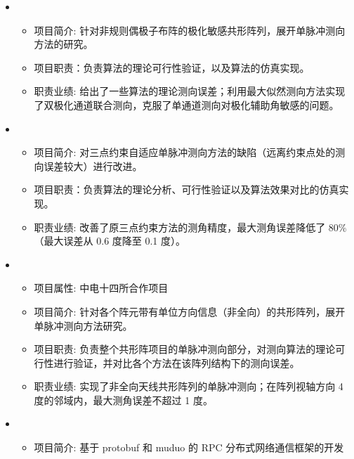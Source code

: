   \begin{itemize}[leftmargin=*]
    \item
      {\small
      \begin{itemize}
        \item 项目简介: 针对非规则偶极子布阵的极化敏感共形阵列，展开单脉冲测向方法的研究。
        \item 项目职责：负责算法的理论可行性验证，以及算法的仿真实现。
        \item 职责业绩: 给出了一些算法的理论测向误差；利用最大似然测向方法实现了双极化通道联合测向，克服了单通道测向对极化辅助角敏感的问题。
      \end{itemize}
        }
    \item
      {\small
      \begin{itemize}
        \item 项目简介: 对三点约束自适应单脉冲测向方法的缺陷（远离约束点处的测向误差较大）进行改进。
        \item 项目职责：负责算法的理论分析、可行性验证以及算法效果对比的仿真实现。
        \item 职责业绩: 改善了原三点约束方法的测角精度，最大测角误差降低了 80\%（最大误差从 0.6 度降至 0.1 度）。
      \end{itemize}
      }
    \item
    {\small
    \begin{itemize}
      \item 项目属性: 中电十四所合作项目
      \item 项目简介: 针对各个阵元带有单位方向信息（非全向）的共形阵列，展开单脉冲测向方法研究。
      \item 项目职责: 负责整个共形阵项目的单脉冲测向部分，对测向算法的理论可行性进行验证，并对比各个方法在该阵列结构下的测向误差。
      \item 职责业绩: 实现了非全向天线共形阵列的单脉冲测向；在阵列视轴方向 4 度的邻域内，最大测角误差不超过 1 度。
    \end{itemize}
    }
    \item 
    {\small
    \begin{itemize}
      \item 项目简介: 基于 protobuf 和 muduo 的 RPC 分布式网络通信框架的开发

\end{itemize}}
\end{itemize}

